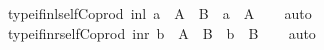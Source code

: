 \begin{isabellebody}
\ type{\isacharunderscore}{\kern0pt}if{\isacharunderscore}{\kern0pt}inl{\isacharunderscore}{\kern0pt}self{\isacharunderscore}{\kern0pt}Coprod{\isacharcolon}{\kern0pt}\ {\isachardoublequoteopen}inl\ a\ {\isacharcolon}{\kern0pt}\ A\ {\isasymCoprod}\ B\ {\isasymLongrightarrow}\ a\ {\isacharcolon}{\kern0pt}\ A{\isachardoublequoteclose}\isanewline
%
\isadelimproof
\ \ %
\endisadelimproof
%
\isatagproof
{}\isamarkupfalse%
\ auto%
\endisatagproof
{\isafoldproof}%
%
\isadelimproof
\isanewline
%
\endisadelimproof
\isanewline
{}\isamarkupfalse%
\ type{\isacharunderscore}{\kern0pt}if{\isacharunderscore}{\kern0pt}inr{\isacharunderscore}{\kern0pt}self{\isacharunderscore}{\kern0pt}Coprod{\isacharcolon}{\kern0pt}\ {\isachardoublequoteopen}inr\ b\ {\isacharcolon}{\kern0pt}\ A\ {\isasymCoprod}\ B\ {\isasymLongrightarrow}\ b\ {\isacharcolon}{\kern0pt}\ B{\isachardoublequoteclose}\isanewline
%
\isadelimproof
\ \ %
\endisadelimproof
%
\isatagproof
{}\isamarkupfalse%
\ auto%
\endisatagproof
{\isafoldproof}%
%
\isadelimproof
\isanewline
%
\endisadelimproof
\isanewline
{}\isamarkupfalse%
\isanewline
\isanewline
%
\isadelimtheory
\isanewline
%
\endisadelimtheory
%
\isatagtheory
{}\isamarkupfalse%
%
\endisatagtheory
{\isafoldtheory}%
%
\isadelimtheory
%
\endisadelimtheory
%
\end{isabellebody}%
\endinput
